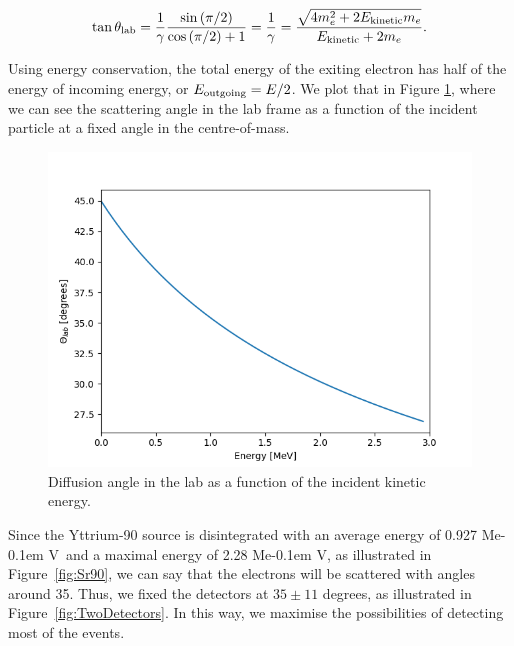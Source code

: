\documentclass[10pt,swedish, openany]{book}
\def\MeV{\ifmmode {\mathrm{\ Me\kern -0.1em V}}\else
                   \textrm{Me\kern -0.1em V}\fi}%
\begin{document}
\begin{equation}
    \tan{\theta_{\rm lab}}= \frac{1}{\gamma}\frac{\sin{(\pi/2)}}{\cos{(\pi/2)}+1} = \frac{1}{\gamma} = \frac{\sqrt{4m_e^2 + 2 E_{\rm kinetic}m_e}}{E_{\rm kinetic}+2m_e}.
\end{equation}

Using energy conservation, the total energy of the exiting electron has half of the energy of incoming energy,  or $E_{\rm outgoing} = E/2$. We plot that in Figure \ref{fig:theta}, where we can see the scattering angle in the lab frame as a function of the incident particle at a fixed angle in the centre-of-mass.\\

\begin{figure}[h]
\includegraphics[scale=0.5]{theta.png}
\centering
\caption{Diffusion angle in the lab as a function of the incident kinetic energy.}
\label{fig:theta}
\end{figure}

Since the Yttrium-90 source is disintegrated with an average energy of 0.927 \MeV~and a maximal energy of 2.28 \MeV, as illustrated in Figure~\ref{fig:Sr90}, we can say that the electrons will be scattered with angles around 35. Thus, we fixed the detectors at $35 \pm 11$ degrees, as illustrated in Figure~\ref{fig:TwoDetectors}. In this way, we maximise the possibilities of detecting most of the events. \\
\end{document}
